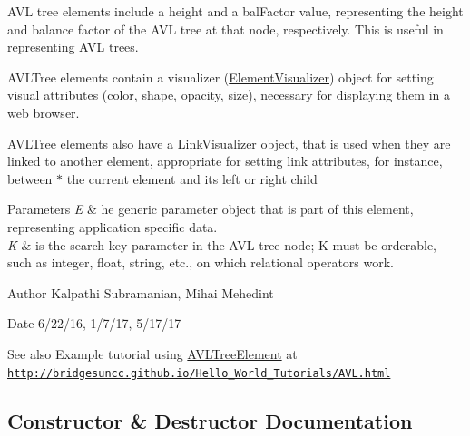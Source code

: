 A\+VL tree elements include a \textquotesingle{}height\textquotesingle{} and a \textquotesingle{}bal\+Factor\textquotesingle{} value, representing the height and balance factor of the A\+VL tree at that node, respectively. This is useful in representing A\+VL trees.

A\+V\+L\+Tree elements contain a visualizer (\mbox{\hyperlink{classbridges_1_1base_1_1_element_visualizer}{Element\+Visualizer}}) object for setting visual attributes (color, shape, opacity, size), necessary for displaying them in a web browser.

A\+V\+L\+Tree elements also have a \mbox{\hyperlink{classbridges_1_1base_1_1_link_visualizer}{Link\+Visualizer}} object, that is used when they are linked to another element, appropriate for setting link attributes, for instance, between $\ast$ the current element and its left or right child


\begin{DoxyParams}{Parameters}
{\em E} & he generic parameter object that is part of this element, representing application specific data. \\
\hline
{\em K} & is the search key parameter in the A\+VL tree node; K must be orderable, such as integer, float, string, etc., on which relational operators work.\\
\hline
\end{DoxyParams}
\begin{DoxyAuthor}{Author}
Kalpathi Subramanian, Mihai Mehedint
\end{DoxyAuthor}
\begin{DoxyDate}{Date}
6/22/16, 1/7/17, 5/17/17
\end{DoxyDate}
\begin{DoxySeeAlso}{See also}
Example tutorial using \mbox{\hyperlink{classbridges_1_1base_1_1_a_v_l_tree_element}{A\+V\+L\+Tree\+Element}} at ~\newline
 \href{http://bridgesuncc.github.io/Hello_World_Tutorials/AVL.html}{\tt http\+://bridgesuncc.\+github.\+io/\+Hello\+\_\+\+World\+\_\+\+Tutorials/\+A\+V\+L.\+html} 
\end{DoxySeeAlso}


\subsection{Constructor \& Destructor Documentation}
\mbox{\label{classbridges_1_1base_1_1_a_v_l_tree_element_a8fe4490d3d5d16991736bd1a7243b904}} 
